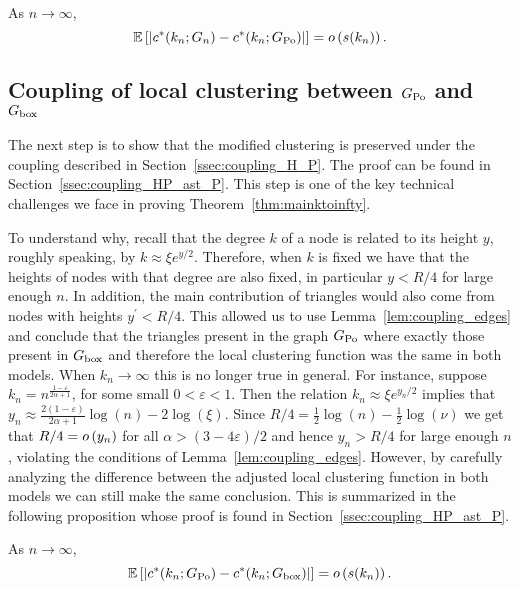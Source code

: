 \begin{proposition}\label{prop:clustering_ast_H_Pois}
As $n \to \infty$,
\[
	\mathbb{E}\left[\left|c^\ast(k_n;G_n) - c^\ast(k_n; G_{{\mathrm{Po}}})\right|\right] = o\left(s(k_n)\right).
\]
\end{proposition}

\subsection{Coupling of local clustering between \texorpdfstring{$G_{{\mathrm{Po}}}$}{G Po} and \texorpdfstring{$G_{\mathrm{box}}$}{G box}}

The next step is to show that the modified clustering is preserved under the coupling described in Section~\ref{ssec:coupling_H_P}. The proof can be found in Section~\ref{ssec:coupling_HP_ast_P}. This step is one of the key technical challenges we face in proving Theorem~\ref{thm:mainktoinfty}. 

To understand why, recall that the degree $k$ of a node is related to its height $y$, roughly speaking, by $k \approx \xi e^{y/2}$. Therefore, when $k$ is fixed we have that the heights of nodes with that degree are also fixed, in particular $y < R/4$ for large enough $n$. In addition, the main contribution of triangles would also come from nodes with heights $y^\prime < R/4$. This allowed us to use Lemma~\ref{lem:coupling_edges} and conclude that the triangles present in the graph $G_{{\mathrm{Po}}}$ where exactly those present in $G_{\mathrm{box}}$ and therefore the local clustering function was the same in both models. When $k_n \to \infty$ this is no longer true in general. For instance, suppose $k_n = n^{\frac{1-\varepsilon}{2\alpha + 1}}$, for some small $0 < \varepsilon < 1$. Then the relation $k_n \approx \xi e^{y_n/2}$ implies that $y_n \approx \frac{2(1-\varepsilon)}{2\alpha + 1}\log(n) - 2\log(\xi)$. Since
$R/4 = \frac{1}{2}\log(n) - \frac{1}{2}\log(\nu)$ we get that $R/4 = o\left(y_n\right)$ for all $\alpha > (3 - 4\varepsilon)/2$ and hence $y_n > R/4$ for large enough $n$, violating the conditions of Lemma~\ref{lem:coupling_edges}. However, by carefully analyzing the difference between the adjusted local clustering function in both models we can still make the same conclusion. This is summarized in the following proposition whose proof is found in Section~\ref{ssec:coupling_HP_ast_P}.

\begin{proposition}\label{prop:couling_c_H_P}
As $n \to \infty$,
\[
	\mathbb{E}\left[\left|c^\ast(k_n; G_{{\mathrm{Po}}}) - c^\ast(k_n; G_{\mathrm{box}})\right|\right] = o\left(s(k_n)\right).
\]
\end{proposition}


